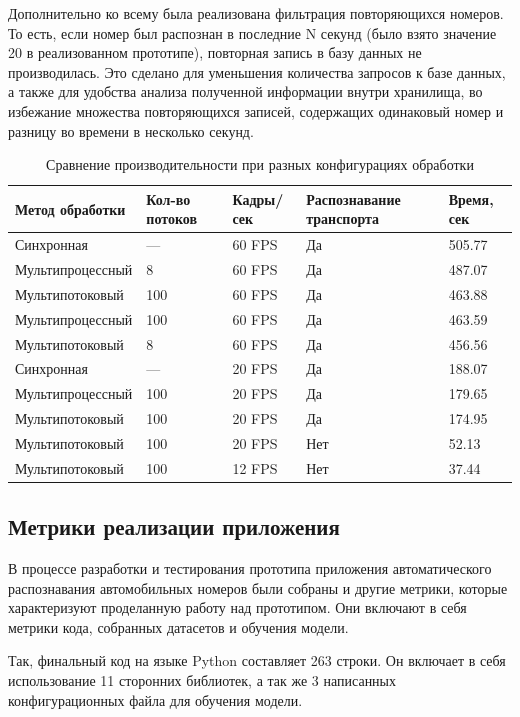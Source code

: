 \documentclass[a4paper,12pt]{article}
\begin{document}
Дополнительно ко всему была реализована фильтрация повторяющихся номеров. То есть, если номер был распознан в последние N секунд (было взято значение 20 в реализованном прототипе), повторная запись в базу данных не производилась. Это сделано для уменьшения количества запросов к базе данных, а также для удобства анализа полученной информации внутри хранилища, во избежание множества повторяющихся записей, содержащих одинаковый номер и разницу во времени в несколько секунд.

\begin{table}[H]
\centering
\begin{tabular}{|p{4cm}|p{2.5cm}|p{2.5cm}|p{3.2cm}|p{3cm}|}
\hline
\textbf{Метод обработки} & \textbf{Кол-во потоков} & \textbf{Кадры/сек} & \textbf{Распознавание транспорта} & \textbf{Время, сек} \\
\hline
Синхронная & --- & 60 FPS & Да & 505.77 \\
Мультипроцессный & 8 & 60 FPS & Да & 487.07 \\
Мультипотоковый & 100 & 60 FPS & Да & 463.88 \\
Мультипроцессный & 100 & 60 FPS & Да & 463.59 \\
Мультипотоковый & 8 & 60 FPS & Да & 456.56 \\
Синхронная &  --- & 20 FPS & Да & 188.07 \\
Мультипроцессный & 100 & 20 FPS & Да & 179.65 \\
Мультипотоковый & 100 & 20 FPS & Да & 174.95 \\
Мультипотоковый & 100 & 20 FPS & Нет & 52.13 \\
Мультипотоковый & 100 & 12 FPS & Нет & 37.44 \\
\hline
\end{tabular}
\caption{Сравнение производительности при разных конфигурациях обработки}
\end{table}

\subsection{Метрики реализации приложения}

В процессе разработки и тестирования прототипа приложения автоматического распознавания автомобильных номеров были собраны и другие метрики, которые характеризуют проделанную работу над прототипом. Они включают в себя метрики кода, собранных датасетов и обучения модели.

Так, финальный код на языке Python составляет 263 строки. Он включает в себя использование 11 сторонних библиотек, а так же 3 написанных конфигурационных файла для обучения модели.
\end{document}

